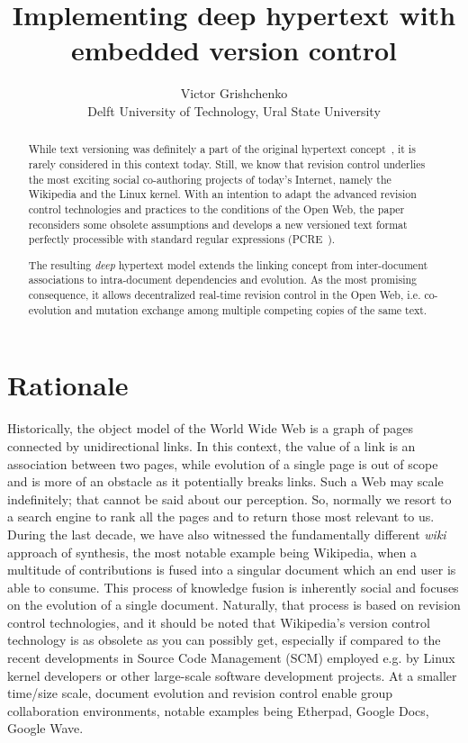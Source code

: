 \documentclass{acm_proc_article-sp}
\date{}
\begin{document}
\title{Implementing deep hypertext with embedded version control}

\author{Victor Grishchenko \\ \small Delft University of Technology, Ural State University }

\maketitle

\begin{abstract}
While text versioning was definitely a part of the original
hypertext concept~\cite{xanadu,hyp-ed-sys}, it is rarely considered
in this context today.
Still, we know that revision control underlies the most exciting
social co-authoring projects of today's Internet, namely the
Wikipedia and the Linux kernel. With an intention to adapt the
advanced revision control technologies and practices to the
conditions of the Open Web, the paper reconsiders some obsolete
assumptions and develops a new versioned text format perfectly
processible with standard regular expressions (PCRE~\cite{pcre}).

The resulting \emph{deep} hypertext model extends the linking
concept from inter-document associations to intra-document
dependencies and evolution. As the most promising consequence,
it allows decentralized real-time revision control in the Open
Web, i.e. co-evolution and mutation exchange among multiple
competing copies of the same text. 

\end{abstract}


\section{Rationale}

Historically, the object model of the World Wide Web is a graph
of pages connected by unidirectional links. In this context,
the value of a link is an association between two pages, while
evolution of a single page is out of scope and is more of an
obstacle as it potentially breaks links.
Such a Web may scale indefinitely; that cannot be said about
our perception. So, normally we resort to a search engine to rank
all the pages and to return those most relevant to us.
During the last decade, we have also witnessed the fundamentally
different \emph{wiki} approach of synthesis, the most notable
example being Wikipedia, when a multitude of contributions is
fused into a singular document which an end user is able to consume.
This process of knowledge fusion is inherently social and
focuses on the evolution of a single document.
Naturally, that process is based on revision control technologies,
and it should be noted that Wikipedia's version control
technology is as obsolete as you can possibly get, especially
if compared to the recent developments in Source Code Management
(SCM) employed e.g. by Linux kernel developers or other 
large-scale software development projects.
At a smaller time/size scale, document evolution and revision control
enable group collaboration environments, notable examples
being Etherpad, Google Docs, Google Wave.
\end{document}
